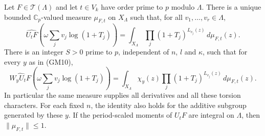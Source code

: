 \begin{theorem}\label{gm-moment-law}
Let $F\in\mathcal T(\Lambda)$ and let $t\in V_k$ have
order prime to $p$ modulo $\Lambda$.
There is a unique bounded $\mathbb C_p$-valued measure
$\mu_{F,t}$ on $X_\Lambda$ such that, for all
$v_1,\ldots,v_r\in\Lambda$,
\[
 \widehat{U_tF}\left(\omega\sum_jv_j\log(1+T_j)\right)
     =\int_{X_\Lambda}\prod_j(1+T_j)^{L_{v_j}(z)}
                                                  \,d\mu_{F,t}(z).
                                                               \tag{GM13}
\]
There is an integer $S>0$ prime to $p$, independent of $n$,
$l$ and $\kappa$, such that for every $y$ as in (GM10),
\[
 \widehat{W_yU_tF}\left(\omega\sum_jv_j\log(1+T_j)\right)
     =\int_{X_\Lambda}\chi_y(z)
                \prod_j(1+T_j)^{L_{v_j}(z)}\,d\mu_{F,t}(z).
                                                               \tag{GM14}
\]
In particular the same measure supplies all derivatives and
all these torsion characters.  For each fixed $n$, the identity
also holds for the additive subgroup generated by these $y$.
If the period-scaled moments of
$U_tF$ are integral on $\Lambda$, then $\|\mu_{F,t}\|\le1$.
\end{theorem}
